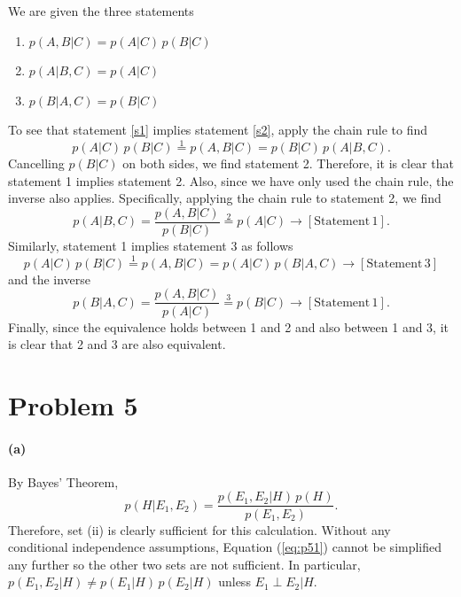 \documentclass[11pt]{article}
\newcommand{\eq}[1]{Equation (\ref{eq:#1})}
\newcommand{\eqlabel}[1]{\label{eq:#1}}
\newcommand{\pr}[1]{\ensuremath{p(#1)}}
\begin{document}
We are given the three statements

\begin{enumerate}
    \item{\label{s1}$\pr{A,B|C} = \pr{A|C}\,\pr{B|C}$}
    \item{\label{s2}$\pr{A|B,C} = \pr{A|C}$}
    \item{\label{s3}$\pr{B|A,C} = \pr{B|C}$}
\end{enumerate}

\noindent To see that statement \ref{s1} implies statement \ref{s2}, apply
the chain rule to find
\begin{equation}
    \pr{A|C}\,\pr{B|C} \stackrel{1}{=} \pr{A,B|C} = \pr{B|C} \, \pr{A | B,C}.
\end{equation}
Cancelling \pr{B|C} on both sides, we find statement 2. Therefore, it is
clear that statement 1 implies statement 2. Also, since we have only used
the chain rule, the inverse also applies. Specifically, applying the chain
rule to statement 2, we find
\begin{equation}
    \pr{A|B,C} = \frac{\pr{A,B|C}}{\pr{B|C}} \stackrel{2}{=} \pr{A|C}
        \to [\mathrm{Statement}\,1].
\end{equation}
Similarly, statement 1 implies statement 3 as follows
\begin{equation}
    \pr{A|C}\,\pr{B|C} \stackrel{1}{=} \pr{A,B|C} = \pr{A|C} \, \pr{B|A,C}
        \to [\mathrm{Statement}\,3]
\end{equation}
and the inverse
\begin{equation}
    \pr{B|A,C} = \frac{\pr{A,B|C}}{\pr{A|C}} \stackrel{3}{=} \pr{B|C}
        \to [\mathrm{Statement}\,1].
\end{equation}
Finally, since the equivalence holds between 1 and 2 and also between 1 and 3,
it is clear that 2 and 3 are also equivalent.


\section{Problem 5}

\paragraph{(a)}

By Bayes' Theorem,
\begin{equation}
    \eqlabel{p51}
    \pr{H | E_1,E_2} = \frac{\pr{E_1, E_2|H} \, \pr{H}}{\pr{E_1,E_2}}.
\end{equation}
Therefore, set (ii) is clearly sufficient for this calculation. Without any
conditional independence assumptions, \eq{p51} cannot be simplified any
further so the other two sets are not sufficient. In particular,
$\pr{E_1, E_2|H} \ne \pr{E_1|H}\,\pr{E_2|H}$ unless $E_1 \perp E_2 | H$.
\end{document}
